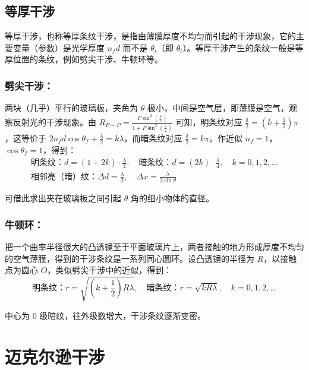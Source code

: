 \documentclass[UTF8]{report}
\theoremstyle{MyLineTheoremStyle} %
\theoremstyle{MyBlockTheoremStyle} %
\theoremstyle{MySubsubsectionStyle} %
\begin{document}
\subsection{等厚干涉} 

等厚干涉，也称等厚条纹干涉，是指由薄膜厚度不均匀而引起的干涉现象，它的主要变量（参数）是光学厚度 $n_f d$ 而不是 $\theta_i$（即 $\theta_t$）。等厚干涉产生的条纹一般是等厚位置的条纹，例如劈尖干涉、牛顿环等。

\subsubsection{劈尖干涉：}

两块（几乎）平行的玻璃板，夹角为 $\theta$ 极小，中间是空气层，即薄膜是空气，观察反射光的干涉现象。由 $R_{F-P} = \frac{ F \sin^2 (\frac{\delta}{2}) }{1 + F \sin^2 (\frac{\delta}{2})}$ 可知，明条纹对应 $\frac{\delta}{2} = (k + \frac{1}{2}) \pi$，这等价于 $2 n_f d\cos \theta_f + \frac{\lambda}{2} = k\lambda$，而暗条纹对应 $\frac{\delta}{2} = k \pi$。作近似 $n_f = 1$，$\cos \theta_f = 1$，得到：
\begin{gather}
    \text{明条纹：} d = \left( 1 + 2k \right)\cdot \frac{\lambda}{4},\quad \text{暗条纹：} d = \left( 2k \right)\cdot \frac{\lambda}{4},\quad k = 0, 1, 2, ... \\ 
    \text{相邻亮（暗）纹：}\Delta d = \frac{\lambda}{2},\quad \Delta x = \frac{\lambda}{2\sin \theta}
\end{gather}


可借此求出夹在玻璃板之间引起 $\theta$ 角的细小物体的直径。

\subsubsection{牛顿环：}

把一个曲率半径很大的凸透镜至于平面玻璃片上，两者接触的地方形成厚度不均匀的空气薄膜，得到的干涉条纹是一系列同心圆环。设凸透镜的半径为 $R$，以接触点为圆心 $O$，类似劈尖干涉中的近似，得到：
\begin{equation}
\text{明条纹：} r = \sqrt{\left(k + \frac{1}{2}\right)R\lambda} 
,\quad 
\text{暗条纹：} r = \sqrt{kR\lambda},\quad k = 0, 1, 2, ...
\end{equation}

中心为 0 级暗纹，往外级数增大，干涉条纹逐渐变密。


\section{迈克尔逊干涉}
\end{document}
